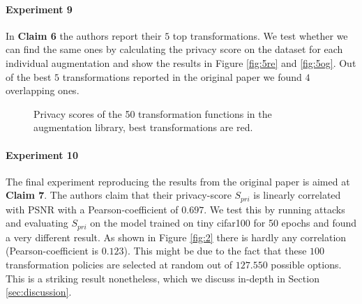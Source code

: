 \paragraph{Experiment 9} In \textbf{Claim 6} the authors report their $5$ top transformations. We test whether we can find the same ones by calculating the privacy score on the dataset for each individual augmentation and show the results in Figure \ref{fig:5re} and \ref{fig:5og}. Out of the best $5$ transformations reported in the original paper we found $4$ overlapping ones. 

\begin{figure}[h]
    \centering
    \hspace{5mm}
    \caption{Privacy scores of the 50 transformation functions in the augmentation library, best transformations are red.}
    \label{fig:5}
    \vspace{-5mm}
\end{figure}

\paragraph{Experiment 10}

The final experiment reproducing the results from the original paper is aimed at \textbf{Claim 7}. The authors claim that their privacy-score $S_{pri}$ is linearly correlated with PSNR with a Pearson-coefficient of $0.697$. We test this by running attacks and evaluating $S_{pri}$ on the model trained on tiny cifar100 for 50 epochs and found a very different result. As shown in Figure \ref{fig:2} there is hardly any correlation (Pearson-coefficient is $0.123$). This might be due to the fact that these $100$ transformation policies are selected at random out of $127.550$ possible options. This is a striking result nonetheless, which we discuss in-depth in Section \ref{sec:discussion}.


